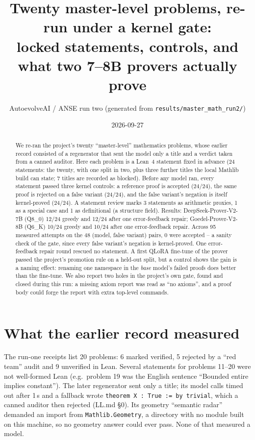 \documentclass[11pt]{article}
\title{Twenty master-level problems, re-run under a kernel gate:\\
locked statements, controls, and what two 7--8B provers actually prove}
\author{AutoevolveAI / ANSE run two (generated from \texttt{results/master\_math\_run2/})}
\date{2026-09-27}
\begin{document}
\sloppy
\maketitle
\begin{abstract}
We re-ran the project's twenty ``master-level'' mathematics problems, whose earlier record consisted of a regenerator that sent the model only a title and a verdict taken from a canned auditor. Here each problem is a Lean~4 statement fixed in advance (24 statements: the twenty, with one split in two, plus three further titles the local Mathlib build can state; 7 titles are recorded as blocked). Before any model ran, every statement passed three kernel controls: a reference proof is accepted (24/24), the same proof is rejected on a false variant (24/24), and the false variant's negation is itself kernel-proved (24/24). A statement review marks 3 statements as arithmetic proxies, 1 as a special case and 1 as definitional (a structure field). Results: DeepSeek-Prover-V2-7B (Q8\_0) 12/24 greedy and 12/24 after one error-feedback repair; Goedel-Prover-V2-8B (Q6\_K) 10/24 greedy and 10/24 after one error-feedback repair. Across 95 measured attempts on the 48 (model, false variant) pairs, 0 were accepted -- a sanity check of the gate, since every false variant's negation is kernel-proved. One error-feedback repair round rescued no statement. A first QLoRA fine-tune of the prover passed the project's promotion rule on a held-out split, but a control shows the gain is a naming effect: renaming one namespace in the \emph{base} model's failed proofs does better than the fine-tune. We also report two holes in the project's own gate, found and closed during this run: a missing axiom report was read as ``no axioms'', and a proof body could forge the report with extra top-level commands.
\end{abstract}

\section{What the earlier record measured}
The run-one receipts list 20 problems: 6 marked verified, 5 rejected by a ``red team'' audit and 9 unverified in Lean. Several statements for problems 11--20 were not well-formed Lean (e.g.\ problem 19 was the English sentence ``Bounded entire implies constant''). The later regenerator sent only a title; its model calls timed out after 1\,s and a fallback wrote \texttt{theorem X : True := by trivial}, which a canned auditor then rejected (LL.md \S0). Its geometry ``semantic radar'' demanded an import from \texttt{Mathlib.Geometry}, a directory with no module built on this machine, so no geometry answer could ever pass. None of that measured a model.
\end{document}
